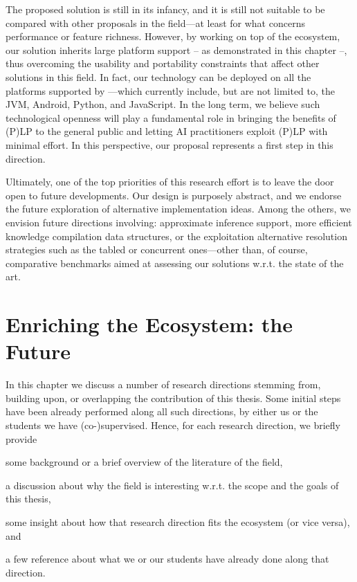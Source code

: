 \documentclass[12pt,a4paper,openright,twoside]{book}
\begin{document}
The proposed solution is still in its infancy, and it is still not suitable to be compared with other proposals in the field---at least for what concerns performance or feature richness.
%
However, by working on top of the \twopkt{} ecosystem, our solution inherits large platform support -- as demonstrated in this chapter --, thus overcoming the usability and portability constraints that affect other solutions in this field.
%
In fact, our technology can be deployed on all the platforms supported by \twopkt{}---which currently include, but are not limited to, the JVM, Android, Python, and JavaScript.
%
In the long term, we believe such technological openness will play a fundamental role in bringing the benefits of (P)LP to the general public and letting AI practitioners exploit (P)LP with minimal effort.
%
In this perspective, our proposal represents a first step in this direction.

Ultimately, one of the top priorities of this research effort is to leave the door open to future developments.
%
Our design is purposely abstract, and we endorse the future exploration of alternative implementation ideas.
%
Among the others, we envision future directions involving: approximate inference support, more efficient knowledge compilation data structures, or the exploitation alternative resolution strategies such as the tabled or concurrent ones---other than, of course, comparative benchmarks aimed at assessing our solutions w.r.t. the state of the art.

\chapter{Enriching the Ecosystem: the Future}
\label{chap:2pkt-future}

In this chapter we discuss a number of research directions stemming from, building upon, or overlapping the contribution of this thesis.
%
Some initial steps have been already performed along all such directions, by either us or the students we have (co-)supervised.
%
Hence, for each research direction, we briefly provide
%
\begin{inlinelist}
    \item some background or a brief overview of the literature of the field,
    \item a discussion about why the field is interesting w.r.t. the scope and the goals of this thesis,
    \item some insight about how that research direction fits the \twopkt{} ecosystem (or vice versa), and
    \item a few reference about what we or our students have already done along that direction.
\end{inlinelist}
\end{document}

